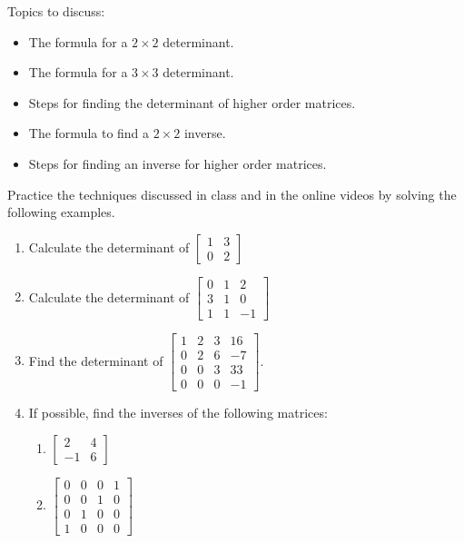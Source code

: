 \documentclass[10pt]{book}
\theoremstyle{definition}
\theoremstyle{remark}
\begin{document}
\begin{large}
\noindent
Topics to discuss:
\begin{itemize}
\item The formula for a $2 \times 2$ determinant.
\item The formula for a $3 \times 3$ determinant.
\item Steps for finding the determinant of higher order matrices.
\item The formula to find a $2 \times 2$ inverse.
\item Steps for finding an inverse for higher order matrices.
\end{itemize}
\newpage

\noindent
Practice the techniques discussed in class and in the online videos by solving the following examples. 
\begin{enumerate}
\item Calculate the determinant of $\begin{bmatrix}  1 & 3 \\ 0 & 2 \end{bmatrix}$
\vfil \vfil \vfil

\item Calculate the determinant of $\begin{bmatrix}  0&1&2\\3&1&0\\1&1&-1 \end{bmatrix}$
\vfil \vfil \vfil

\item Find the determinant of $\begin{bmatrix}1&2&3&16\\0&2&6&-7\\0&0&3&33\\0&0&0&-1 \end{bmatrix}$.
\vfil \vfil \vfil
\newpage

\item If possible, find the inverses of the following matrices:
\begin{enumerate}
\item $\begin{bmatrix}  2 & 4 \\ -1 & 6 \end{bmatrix}$
\item $\begin{bmatrix}0&0&0&1\\0&0&1&0\\0&1&0&0\\1&0&0&0\end{bmatrix}$
\end{enumerate}\vfil\vfil
\newpage


\end{enumerate}
\end{large}
\end{document}
